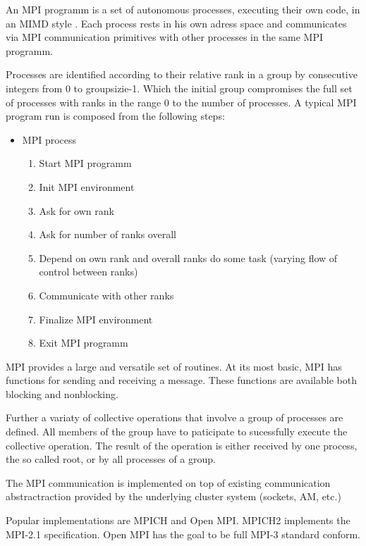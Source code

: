 An MPI programm is a set of autonomous processes, executing their own
code, in an MIMD style \cite{Flynn:1972:COE:1952456.1952459}. Each
process rests in his own adress space and communicates via MPI
communication primitives with other processes in the same MPI
programm. 

Processes are identified according to their relative rank in a group by
consecutive integers from 0 to groupsizie-1. Which the initial group
compromises the full set of processes with ranks in the range 0 to 
the number of processes. A typical MPI program run is composed from
the following steps:

\begin{itemize}
  \item MPI process
    \begin{enumerate}
      \item Start MPI programm
      \item Init MPI environment
      \item Ask for own rank
      \item Ask for number of ranks overall
      \item Depend on own rank and overall ranks do some task (varying flow of control between ranks)
      \item Communicate with other ranks
      \item Finalize MPI environment
      \item Exit MPI programm
    \end{enumerate}
\end{itemize}

MPI provides a large and versatile set of routines. At its most
basic, MPI has functions for sending and receiving a message.
These functions are available both blocking and nonblocking.

Further a variaty of collective operations that involve
a group of processes are defined. All members of the group
have to paticipate to sucessfully execute the collective operation.
The result of the operation is either received by one process,
the so called root, or by all processes of a group.



The MPI communication is implemented on top of existing communication
abstractraction provided by the underlying cluster system (sockets, AM, etc.)

Popular implementations are MPICH and Open MPI. MPICH2 implements the
MPI-2.1 specification. Open MPI has the goal to be full MPI-3 standard conform.



